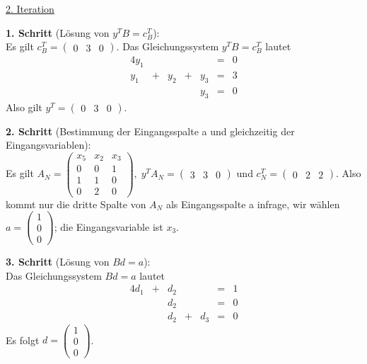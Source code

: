 \documentclass[10pt,a4paper,oneside,ngerman,numbers=noenddot]{scrartcl}
\begin{document}
		\underline{2. Iteration}
		
		\textbf{1. Schritt} (Lösung von $y^{T}B = c_{B}^{T}$):\\
		Es gilt $c_{B}^{T} = \begin{pmatrix} 0 & 3 & 0 \end{pmatrix}$. Das Gleichungssystem $y^{T}B = c_{B}^{T}$ lautet
		\begin{alignat*}{4}
			y_{1} && && &=& 0 \\
			y_{1} &+& y_{2} &+& y_{3} &=& 3 \\
			&& && y_{3} &=& 0
		\end{alignat*}
		Also gilt $y^{T} = \begin{pmatrix} 0 & 3 & 0 \end{pmatrix}$.
		
		\textbf{2. Schritt} (Bestimmung der Eingangsspalte a und gleichzeitig der Eingangsvariablen):\\
		Es gilt $A_{N} = \begin{pmatrix} x_{5} & x_{2} & x_{3} \\ 0 & 0 & 1 \\ 1 & 1 & 0 \\ 0 & 2 & 0 \end{pmatrix},\; y^{T}A_{N} = \begin{pmatrix} 3 & 3 & 0 \end{pmatrix}$ und $c_{N}^{T} = \begin{pmatrix} 0 & 2 & 2 \end{pmatrix}$. Also kommt nur die dritte Spalte von $A_{N}$ als Eingangsspalte a infrage, wir wählen $a = \begin{pmatrix} 1 \\ 0 \\ 0 \end{pmatrix}$; die Eingangsvariable ist $x_{3}$.
		
		\textbf{3. Schritt} (Lösung von $Bd = a$):\\
		Das Gleichungssystem $Bd = a$ lautet
		\begin{alignat*}{4}
			d_{1} &+& d_{2} && &=& 1 \\
			&& d_{2} && &=& 0 \\
			&& d_{2} &+& d_{3} &=& 0
		\end{alignat*}
		Es folgt $d = \begin{pmatrix}1 \\ 0 \\ 0 \end{pmatrix}$.
		
\end{document}
